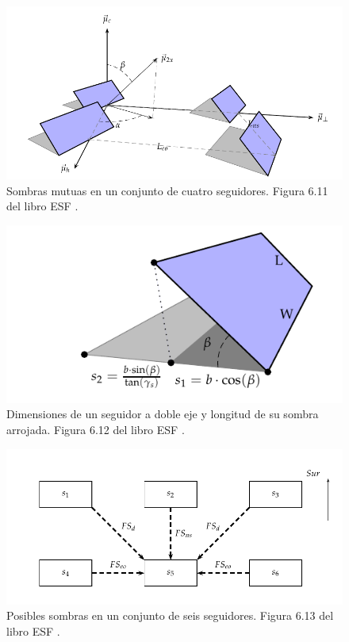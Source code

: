 \begin{figure}[htbp]
\centering
\includegraphics[height=0.2\textheight]{figuras/Sombras2X.pdf}
\caption{Sombras mutuas en un conjunto de cuatro seguidores. Figura 6.11 del libro ESF \cite{Perpinan2023}. \label{fig:sombras-doble}}
\end{figure}
\begin{figure}[htbp]
\centering
\includegraphics[height=0.2\textheight]{figuras/DimensionesSeguidorSombra.pdf}
\caption{Dimensiones de un seguidor a doble eje y longitud de su sombra arrojada. Figura 6.12 del libro ESF \cite{Perpinan2023}. \label{fig:dimensiones-sombras-doble}}
\end{figure}

\begin{figure}[htbp]
\centering
\includegraphics[height=0.2\textheight]{figuras/SixTrackerShadow.pdf}
\caption{Posibles sombras en un conjunto de seis seguidores. Figura 6.13 del libro ESF \cite{Perpinan2023}. \label{fig:conjunto-seis-seguidores}}
\end{figure}


